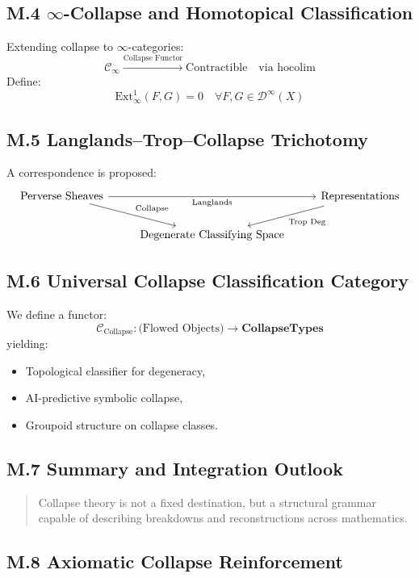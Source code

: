 \documentclass[11pt]{article}
\begin{document}
\begin{axiom}
\begin{axiom}
{{\subsection*{M.4 $\infty$-Collapse and Homotopical Classification}

Extending collapse to $\infty$-categories:
\[
\mathcal{C}_\infty \xrightarrow{\text{Collapse Functor}} \text{Contractible} \quad \text{via } \mathrm{hocolim}
\]
Define:
\[
\mathrm{Ext}^1_\infty(F,G) = 0 \quad \forall F,G \in \mathcal{D}^\infty(X)
\]

\subsection*{M.5 Langlands–Trop–Collapse Trichotomy}

A correspondence is proposed:
\[
\begin{tikzcd}
\text{Perverse Sheaves} \arrow[dr, "\text{Collapse}"] \arrow[rr, "\text{Langlands}"'] & & \text{Representations} \arrow[dl, "\text{Trop Deg}"] \\
& \text{Degenerate Classifying Space} &
\end{tikzcd}
\]

\subsection*{M.6 Universal Collapse Classification Category}

We define a functor:
\[
\mathcal{C}_{\text{Collapse}} : \text{(Flowed Objects)} \to \mathbf{CollapseTypes}
\]
yielding:
\begin{itemize}
  \item Topological classifier for degeneracy,
  \item AI-predictive symbolic collapse,
  \item Groupoid structure on collapse classes.
\end{itemize}

\subsection*{M.7 Summary and Integration Outlook}

\begin{quote}
Collapse theory is not a fixed destination, but a structural grammar  
capable of describing breakdowns and reconstructions across mathematics.
\end{quote}

\subsection*{M.8 Axiomatic Collapse Reinforcement}

}}
\end{axiom}
\end{axiom}
\end{document}
